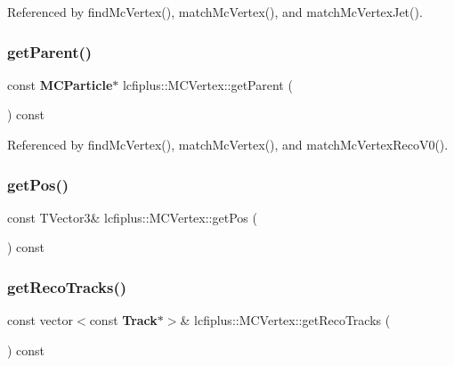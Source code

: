 Referenced by find\+Mc\+Vertex(), match\+Mc\+Vertex(), and match\+Mc\+Vertex\+Jet().

\mbox{\label{classlcfiplus_1_1MCVertex_ae9f06f613a0280226c00ddf49f2db834}} 
\subsubsection{get\+Parent()}
{\footnotesize\ttfamily const \textbf{ M\+C\+Particle}$\ast$ lcfiplus\+::\+M\+C\+Vertex\+::get\+Parent (\begin{DoxyParamCaption}{ }\end{DoxyParamCaption}) const\hspace{0.3cm}{\ttfamily [inline]}}



Referenced by find\+Mc\+Vertex(), match\+Mc\+Vertex(), and match\+Mc\+Vertex\+Reco\+V0().

\mbox{\label{classlcfiplus_1_1MCVertex_ae67d3adfe07dd60ceed570f6d72810fc}} 
\subsubsection{get\+Pos()}
{\footnotesize\ttfamily const T\+Vector3\& lcfiplus\+::\+M\+C\+Vertex\+::get\+Pos (\begin{DoxyParamCaption}{ }\end{DoxyParamCaption}) const\hspace{0.3cm}{\ttfamily [inline]}}

\mbox{\label{classlcfiplus_1_1MCVertex_a36a0d3c1cd8a0b3942872e5af6f24e55}} 
\subsubsection{get\+Reco\+Tracks()}
{\footnotesize\ttfamily const vector$<$const \textbf{ Track}$\ast$$>$\& lcfiplus\+::\+M\+C\+Vertex\+::get\+Reco\+Tracks (\begin{DoxyParamCaption}{ }\end{DoxyParamCaption}) const\hspace{0.3cm}{\ttfamily [inline]}}



